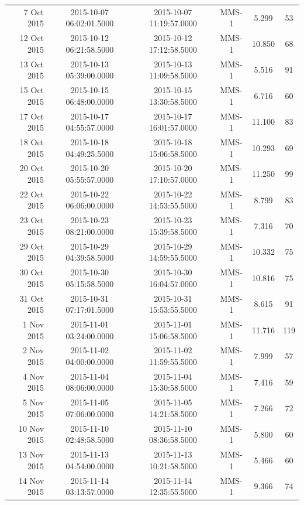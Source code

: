 \begin{longtable}{r|ccccc}
7 Oct 2015     &  2015-10-07 06:02:01.5000 &  2015-10-07 11:19:57.0000 &  MMS-1 &    5.299 &     53 \\
12 Oct 2015    &  2015-10-12 06:21:58.5000 &  2015-10-12 17:12:58.5000 &  MMS-1 &   10.850 &     68 \\
13 Oct 2015    &  2015-10-13 05:39:00.0000 &  2015-10-13 11:09:58.5000 &  MMS-1 &    5.516 &     91 \\
15 Oct 2015    &  2015-10-15 06:48:00.0000 &  2015-10-15 13:30:58.5000 &  MMS-1 &    6.716 &     60 \\
17 Oct 2015    &  2015-10-17 04:55:57.0000 &  2015-10-17 16:01:57.0000 &  MMS-1 &   11.100 &     83 \\
18 Oct 2015    &  2015-10-18 04:49:25.5000 &  2015-10-18 15:06:58.5000 &  MMS-1 &   10.293 &     69 \\
20 Oct 2015    &  2015-10-20 05:55:57.0000 &  2015-10-20 17:10:57.0000 &  MMS-1 &   11.250 &     99 \\
22 Oct 2015    &  2015-10-22 06:06:00.0000 &  2015-10-22 14:53:55.5000 &  MMS-1 &    8.799 &     83 \\
23 Oct 2015    &  2015-10-23 08:21:00.0000 &  2015-10-23 15:39:58.5000 &  MMS-1 &    7.316 &     70 \\
29 Oct 2015    &  2015-10-29 04:39:58.5000 &  2015-10-29 14:59:55.5000 &  MMS-1 &   10.332 &     75 \\
30 Oct 2015    &  2015-10-30 05:15:58.5000 &  2015-10-30 16:04:57.0000 &  MMS-1 &   10.816 &     75 \\
31 Oct 2015    &  2015-10-31 07:17:01.5000 &  2015-10-31 15:53:55.5000 &  MMS-1 &    8.615 &     91 \\
1 Nov 2015     &  2015-11-01 03:24:00.0000 &  2015-11-01 15:06:58.5000 &  MMS-1 &   11.716 &    119 \\
2 Nov 2015     &  2015-11-02 04:00:00.0000 &  2015-11-02 11:59:55.5000 &  MMS-1 &    7.999 &     57 \\
4 Nov 2015     &  2015-11-04 08:06:00.0000 &  2015-11-04 15:30:58.5000 &  MMS-1 &    7.416 &     59 \\
5 Nov 2015     &  2015-11-05 07:06:00.0000 &  2015-11-05 14:21:58.5000 &  MMS-1 &    7.266 &     72 \\
10 Nov 2015    &  2015-11-10 02:48:58.5000 &  2015-11-10 08:36:58.5000 &  MMS-1 &    5.800 &     60 \\
13 Nov 2015    &  2015-11-13 04:54:00.0000 &  2015-11-13 10:21:58.5000 &  MMS-1 &    5.466 &     60 \\
14 Nov 2015    &  2015-11-14 03:13:57.0000 &  2015-11-14 12:35:55.5000 &  MMS-1 &    9.366 &     74 \\

\end{longtable}
